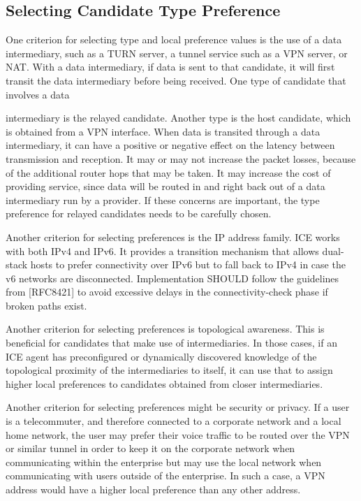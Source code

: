 \documentclass{article}
\begin{document}
\subsection{Selecting Candidate Type Preference}

One criterion for selecting type and local preference values is the use of a data intermediary, such as a TURN server, a tunnel service such as a VPN server, or NAT.  With a data intermediary, if data is sent to that candidate, it will first transit the data intermediary before being received.  One type of candidate that involves a data

intermediary is the relayed candidate.  Another type is the host candidate, which is obtained from a VPN interface.  When data is transited through a data intermediary, it can have a positive or negative effect on the latency between transmission and reception. It may or may not increase the packet losses, because of the additional router hops that may be taken.  It may increase the cost of providing service, since data will be routed in and right back out of a data intermediary run by a provider.  If these concerns are important, the type preference for relayed candidates needs to be carefully chosen.

Another criterion for selecting preferences is the IP address family. ICE works with both IPv4 and IPv6.  It provides a transition mechanism that allows dual-stack hosts to prefer connectivity over IPv6 but to fall back to IPv4 in case the v6 networks are disconnected.  Implementation SHOULD follow the guidelines from [RFC8421] to avoid excessive delays in the connectivity-check phase if broken paths exist.

Another criterion for selecting preferences is topological awareness. This is beneficial for candidates that make use of intermediaries. In those cases, if an ICE agent has preconfigured or dynamically discovered knowledge of the topological proximity of the intermediaries to itself, it can use that to assign higher local preferences to candidates obtained from closer intermediaries.

Another criterion for selecting preferences might be security or privacy.  If a user is a telecommuter, and therefore connected to a corporate network and a local home network, the user may prefer their voice traffic to be routed over the VPN or similar tunnel in order to keep it on the corporate network when communicating within the enterprise but may use the local network when communicating with users outside of the enterprise.  In such a case, a VPN address would have a higher local preference than any other address.
\end{document}
